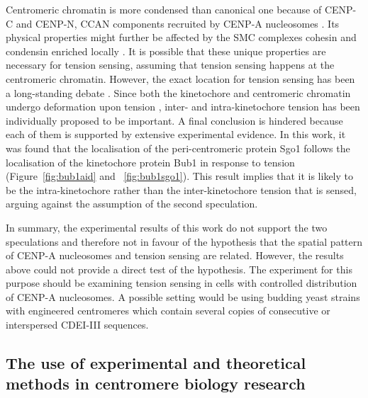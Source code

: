 Centromeric chromatin is more condensed than canonical one because of CENP-C and CENP-N, CCAN components recruited by CENP-A nucleosomes \citep{Geiss2014, Panchenko2011, Zhou2022}. Its physical properties might further be affected by the SMC complexes cohesin and condensin enriched locally \citep{Verzijlbergen2014, Haase2012Bub1Dynamics, Paldi2020ConvergentPericentromeres}. It is possible that these unique properties are necessary for tension sensing, assuming that tension sensing happens at the centromeric chromatin. However, the exact location for tension sensing has been a long-standing  debate \citep{McVey2021AuroraSegregation}. Since both the kinetochore and centromeric chromatin undergo deformation upon tension \citep{Goshima2000EstablishingYeast, Roscioli2020}, inter- and intra-kinetochore tension has been individually proposed to be important. A final conclusion is hindered because each of them is supported by extensive experimental evidence. In this work, it was found that the localisation of the peri-centromeric protein Sgo1 follows the localisation of the kinetochore protein Bub1 in response to tension (Figure~\ref{fig:bub1aid} and ~\ref{fig:bub1sgo1}). This result implies that it is likely to be the intra-kinetochore rather than the inter-kinetochore tension that is sensed, arguing against the assumption of the second speculation. 

In summary, the experimental results of this work do not support the two speculations and therefore not in favour of the hypothesis that the spatial pattern of CENP-A nucleosomes and tension sensing are related. However, the results above could not provide a direct test of the hypothesis. The experiment for this purpose should be examining tension sensing in cells with controlled distribution of CENP-A nucleosomes. A possible setting would be using budding yeast strains with engineered centromeres which contain several copies of consecutive or interspersed CDEI-III sequences. 

\subsection{The use of experimental and theoretical methods in centromere biology research}

